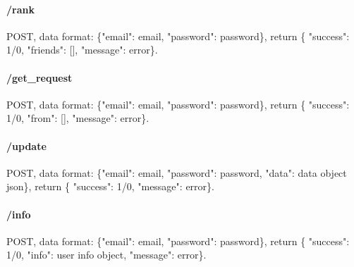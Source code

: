 \paragraph{/rank} POST, data format: \{"email": email, "password": password\}, return \{ "success": 1/0, "friends": [], "message": error\}.
\paragraph{/get\_request} POST, data format: \{"email": email, "password": password\}, return \{ "success": 1/0, "from": [], "message": error\}.
\paragraph{/update} POST, data format: \{"email": email, "password": password, "data": data object json\}, return \{ "success": 1/0, "message": error\}.
\paragraph{/info} POST, data format: \{"email": email, "password": password\}, return \{ "success": 1/0, "info": user info object, "message": error\}.

